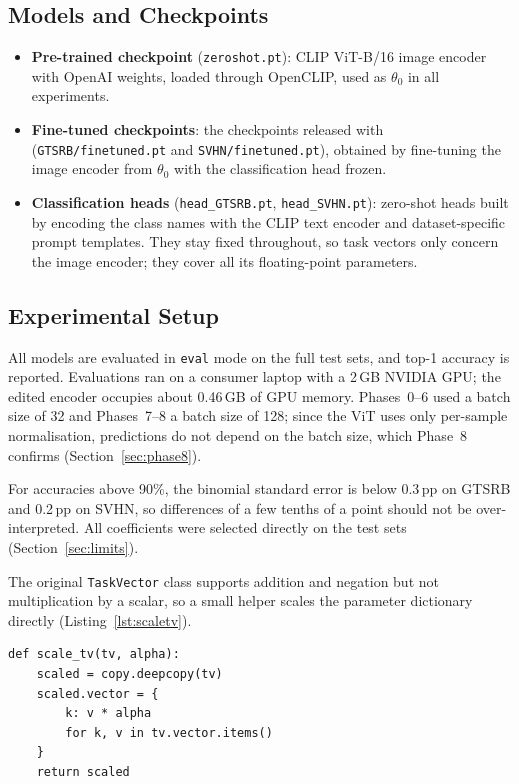 \documentclass[11pt,a4paper,twocolumn]{article}
\newcommand{\pp}{\,pp}
\begin{document}
\subsection{Models and Checkpoints}
\begin{itemize}
  \item \textbf{Pre-trained checkpoint} (\texttt{zeroshot.pt}): CLIP
  ViT-B/16 image encoder with OpenAI weights, loaded through OpenCLIP,
  used as $\theta_0$ in all experiments.
  \item \textbf{Fine-tuned checkpoints}: the checkpoints released
  with~\citet{ilharco2023} (\texttt{GTSRB/\allowbreak finetuned.pt} and
  \texttt{SVHN/\allowbreak finetuned.pt}), obtained by fine-tuning the
  image encoder from $\theta_0$ with the classification head frozen.
  \item \textbf{Classification heads} (\texttt{head\_GTSRB.pt},
  \texttt{head\_SVHN.pt}): zero-shot heads built by encoding the class
  names with the CLIP text encoder and dataset-specific prompt templates.
  They stay fixed throughout, so task vectors only concern the image
  encoder; they cover all its floating-point parameters.
\end{itemize}

\subsection{Experimental Setup}
All models are evaluated in \texttt{eval} mode on the full test sets, and
top-1 accuracy is reported. Evaluations ran on a consumer laptop with a
2\,GB NVIDIA GPU; the edited encoder occupies about 0.46\,GB of GPU memory. Phases~0--6 used a batch
size of 32 and Phases~7--8 a batch size of 128; since the ViT uses only
per-sample normalisation, predictions do not depend on the batch size,
which Phase~8 confirms (Section~\ref{sec:phase8}).

For accuracies above 90\%, the binomial standard error is below 0.3\pp{}
on GTSRB and 0.2\pp{} on SVHN, so differences of a few tenths of a point
should not be over-interpreted. All coefficients were selected directly
on the test sets (Section~\ref{sec:limits}).

The original \texttt{TaskVector} class supports addition and negation but
not multiplication by a scalar, so a small helper scales the parameter
dictionary directly (Listing~\ref{lst:scaletv}).

\begin{lstlisting}[float=t,caption={Helper used to scale a task vector by an arbitrary (also negative) coefficient.},label={lst:scaletv}]
def scale_tv(tv, alpha):
    scaled = copy.deepcopy(tv)
    scaled.vector = {
        k: v * alpha
        for k, v in tv.vector.items()
    }
    return scaled
\end{lstlisting}
\end{document}
